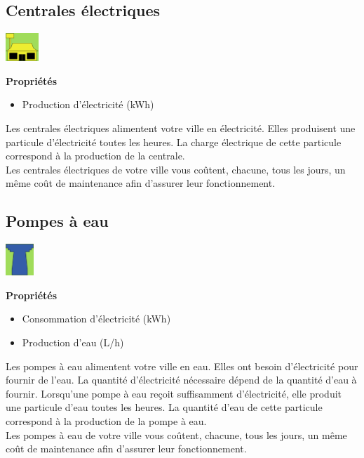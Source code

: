 \documentclass[11pt]{report}
\begin{document}
\subsection{Centrales électriques}
\begin{center}
	\begin{minipage}{0.25\textwidth}
		\begin{flushright}
			\includegraphics[height=40px]{powerplant}
		\end{flushright}
	\end{minipage}
	\begin{minipage}{0.7\textwidth}
		\textbf{Propriétés}
		\begin{itemize}
			\item Production d'électricité (kWh)
		\end{itemize}
	\end{minipage}
\end{center}
Les centrales électriques alimentent votre ville en électricité.
Elles produisent une particule d'électricité toutes les heures. La charge électrique de cette particule correspond à la production de la centrale.\\
Les centrales électriques de votre ville vous coûtent, chacune, tous les jours, un même coût de maintenance afin d'assurer leur fonctionnement.


\subsection{Pompes à eau}
\begin{center}
	\begin{minipage}{0.25\textwidth}
		\begin{flushright}
			\includegraphics[height=45px]{pump}
		\end{flushright}
	\end{minipage}
	\begin{minipage}{0.7\textwidth}
		\textbf{Propriétés}
		\begin{itemize}
			\item Consommation d'électricité (kWh)
			\item Production d'eau (L/h)
		\end{itemize}
	\end{minipage}
\end{center}
Les pompes à eau alimentent votre ville en eau.
Elles ont besoin d'électricité pour fournir de l'eau. La quantité d'électricité nécessaire dépend de la quantité d'eau à fournir. Lorsqu'une pompe à eau reçoit suffisamment d'électricité, elle produit une particule d'eau toutes les heures. La quantité d'eau de cette particule correspond à la production de la pompe à eau.\\
Les pompes à eau de votre ville vous coûtent, chacune, tous les jours, un même coût de maintenance afin d'assurer leur fonctionnement.
\end{document}
